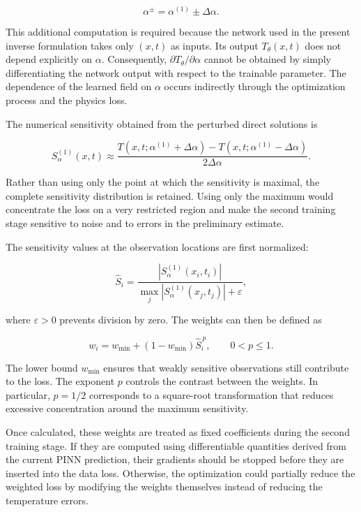 \begin{equation}
\alpha^{\pm}
=
\alpha^{(1)}
\pm
\Delta\alpha.
\end{equation}

This additional computation is required because the network used in the present
inverse formulation takes only $(x,t)$ as inputs. Its output
$T_{\theta}(x,t)$ does not depend explicitly on $\alpha$. Consequently,
$\partial T_{\theta}/\partial\alpha$ cannot be obtained by simply differentiating
the network output with respect to the trainable parameter. The dependence of the
learned field on $\alpha$ occurs indirectly through the optimization process and
the physics loss.

The numerical sensitivity obtained from the perturbed direct solutions is

\begin{equation}
S_{\alpha}^{(1)}(x,t)
\approx
\frac{
T(x,t;\alpha^{(1)}+\Delta\alpha)
-
T(x,t;\alpha^{(1)}-\Delta\alpha)
}{
2\Delta\alpha
}.
\end{equation}

Rather than using only the point at which the sensitivity is maximal, the complete
sensitivity distribution is retained. Using only the maximum would concentrate
the loss on a very restricted region and make the second training stage sensitive
to noise and to errors in the preliminary estimate.

The sensitivity values at the observation locations are first normalized:

\begin{equation}
\widehat{S}_i
=
\frac{
\left|S_{\alpha}^{(1)}(x_i,t_i)\right|
}{
\displaystyle
\max_j
\left|S_{\alpha}^{(1)}(x_j,t_j)\right|
+
\varepsilon
},
\end{equation}

where $\varepsilon>0$ prevents division by zero. The weights can then be defined
as

\begin{equation}
w_i
=
w_{\min}
+
\left(1-w_{\min}\right)
\widehat{S}_i^{\,p},
\qquad
0<p\leq 1.
\end{equation}

The lower bound $w_{\min}$ ensures that weakly sensitive observations still
contribute to the loss. The exponent $p$ controls the contrast between the
weights. In particular, $p=1/2$ corresponds to a square-root transformation that
reduces excessive concentration around the maximum sensitivity.

Once calculated, these weights are treated as fixed coefficients during the
second training stage. If they are computed using differentiable quantities
derived from the current PINN prediction, their gradients should be stopped
before they are inserted into the data loss. Otherwise, the optimization could
partially reduce the weighted loss by modifying the weights themselves instead of
reducing the temperature errors.

